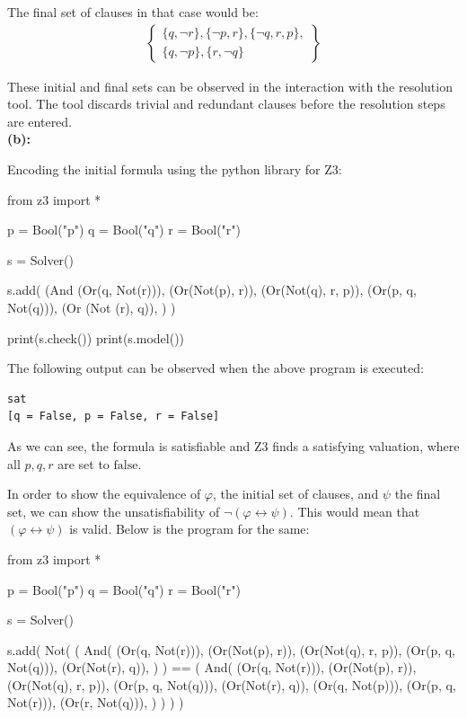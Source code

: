 \documentclass[12pt,letterpaper, onecolumn]{exam}
\begin{document}
\begin{questions}
	The final set of clauses in that case would be:
	\begin{align*}
		\left .
			\begin{cases}
				\{q, \neg r\}, \{\neg p, r\}, \{\neg q, r, p\}, \\
				\{ q, \neg p \}, \{ r, \neg q \}
			\end{cases}
		\right\}
	\end{align*}

	These initial and final sets can be observed in the interaction with the resolution tool. The tool discards trivial and redundant clauses before the resolution steps are entered. \\
	

	\textbf{(b):}

	Encoding the initial formula using the python library for Z3:

	\begin{python}
from z3 import *

p = Bool("p")
q = Bool("q")
r = Bool("r")

s = Solver()

s.add(
	(And 
		(Or(q, Not(r))),
		(Or(Not(p), r)),
		(Or(Not(q), r, p)), 
		(Or(p, q, Not(q))), 
		(Or (Not (r), q)),
	)
)


print(s.check())
print(s.model())
	\end{python}

	The following output can be observed when the above program is executed:
\begin{lstlisting}
sat
[q = False, p = False, r = False]
\end{lstlisting}
As we can see, the formula is satisfiable and Z3 finds a satisfying valuation, where all $p, q, r$ are set to $\text{false}$.

In order to show the equivalence of $ \varphi $, the initial set of clauses, and $ \psi $ the final set, we can show the unsatisfiability of 
$ \neg (\varphi \leftrightarrow \psi) $. This would mean that $ (\varphi \leftrightarrow \psi) $ is valid. Below is the program for the same:
\begin{python}
from z3 import *

p = Bool("p")
q = Bool("q")
r = Bool("r")

s = Solver()

s.add(
	Not(
		(
			And(
				(Or(q, Not(r))),
				(Or(Not(p), r)),
				(Or(Not(q), r, p)),
				(Or(p, q, Not(q))),
				(Or(Not(r), q)),
			)
		)
		== (
			And(
				(Or(q, Not(r))),
				(Or(Not(p), r)),
				(Or(Not(q), r, p)),
				(Or(p, q, Not(q))),
				(Or(Not(r), q)),
				(Or(q, Not(p))),
				(Or(p, q, Not(r))),
				(Or(r, Not(q))),
			)
		)
	)
)


\end{python}
\end{questions}
\end{document}
